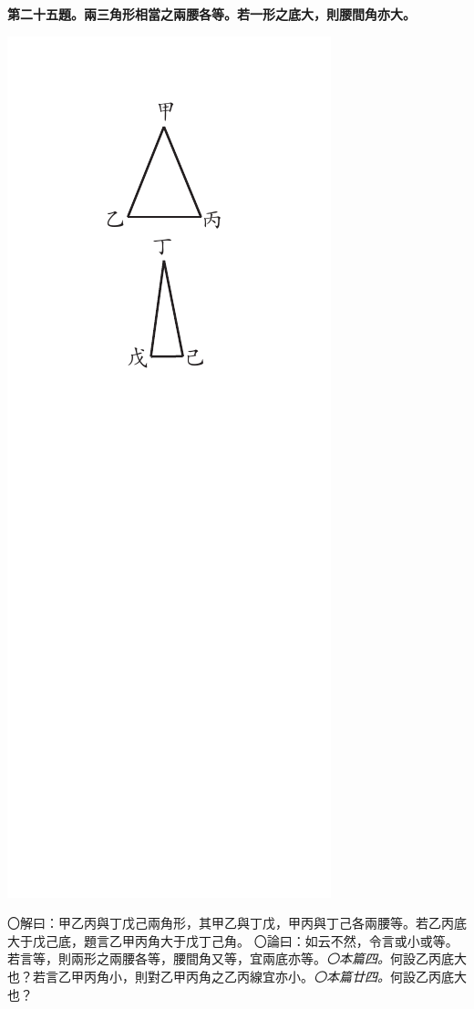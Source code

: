 \documentclass[12pt,b5paper,landscape]{article}
\newcommand{\ccom}[1]{{\footnotesize \emph{〇#1}}}
\newcommand{\bcom}[1]{〇#1}
\newcommand{\cthm}[1]{{
\vspace{8pt}

\bfseries #1}}
\begin{document}
\begin{multicols}{2}
\cthm{第二十五題。兩三角形相當之兩腰各等。若一形之底大，則腰間角亦大。}
\begin{center}
      \includegraphics[angle=90]{eu71}
\end{center}
\bcom{解曰：甲乙丙與丁戊己兩角形，其甲乙與丁戊，甲丙與丁己各兩腰等。若乙丙底大于戊己底，題言乙甲丙角大于戊丁己角。}
\bcom{論曰：如云不然，令言或小或等。若言等，則兩形之兩腰各等，腰間角又等，宜兩底亦等。\ccom{本篇四。}何設乙丙底大也？若言乙甲丙角小，則對乙甲丙角之乙丙線宜亦小。\ccom{本篇廿四。}何設乙丙底大也？}


\end{multicols}
\end{document}
